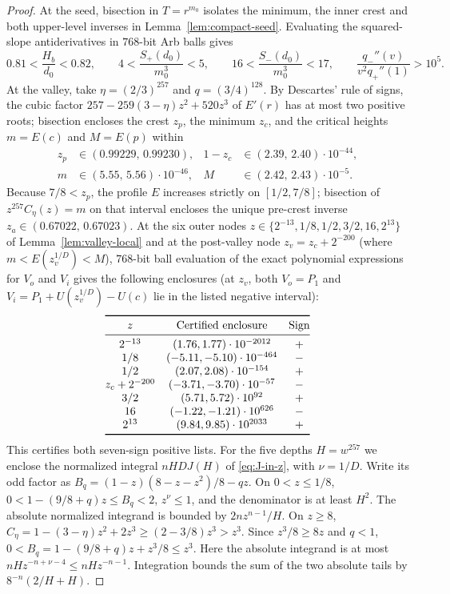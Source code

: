 \begin{proof}
At the seed, bisection in $T=r^{m_0}$ isolates the minimum, the inner
crest and both upper-level inverses in Lemma~\ref{lem:compact-seed}.
Evaluating the squared-slope antiderivatives in $768$-bit Arb balls gives
\[
 0.81<\frac{H_b}{d_0}<0.82,\qquad 4<\frac{S_+(d_0)}{m_0^3}<5,\qquad
 16<\frac{S_-(d_0)}{m_0^3}<17,\qquad \frac{q_-''(v)}{v^2q_+''(1)}>10^5 .
\]
At the valley, take $\eta=(2/3)^{257}$ and $q=(3/4)^{128}$. By Descartes'
rule of signs, the cubic factor $257-259(3-\eta)z^2+520z^3$ of $E'(r)$
has at most two positive roots; bisection encloses the crest $z_p$, the
minimum $z_c$, and the critical heights $m=E(c)$ and $M=E(p)$ within
\[
 \begin{aligned}
  z_p &\in (0.99229,\,0.99230), & 1-z_c &\in (2.39,\,2.40)\cdot 10^{-44}, \\
  m &\in (5.55,\,5.56)\cdot 10^{-46}, & M &\in (2.42,\,2.43)\cdot 10^{-5}.
 \end{aligned}
\]
Because $7/8<z_p$, the profile $E$ increases strictly on $[1/2,7/8]$;
bisection of $z^{257}C_\eta(z)=m$ on that interval encloses the unique
pre-crest inverse $z_a\in(0.67022,\,0.67023)$. At the six outer nodes
$z\in\{2^{-13},1/8,1/2,3/2,16,2^{13}\}$ of Lemma~\ref{lem:valley-local}
and at the post-valley node $z_v=z_c+2^{-200}$ (where $m<E(z_v^{1/D})<M$),
$768$-bit ball evaluation of the exact polynomial expressions for $V_o$
and $V_i$ gives the following enclosures (at $z_v$, both $V_o=P_1$ and
$V_i=P_1+U(z_v^{1/D})-U(c)$ lie in the listed negative interval):
\[
\begin{array}{@{}ccc@{}}
\toprule
 z & \text{Certified enclosure} & \text{Sign}\\
\midrule
 2^{-13} & (1.76,1.77)\cdot 10^{-2012} & +\\
 1/8 & (-5.11,-5.10)\cdot 10^{-464} & -\\
 1/2 & (2.07,2.08)\cdot 10^{-154} & +\\
 z_c+2^{-200} & (-3.71,-3.70)\cdot 10^{-57} & -\\
 3/2 & (5.71,5.72)\cdot 10^{92} & +\\
 16 & (-1.22,-1.21)\cdot 10^{626} & -\\
 2^{13} & (9.84,9.85)\cdot 10^{2033} & +\\
\bottomrule
\end{array}
\]
This certifies both seven-sign positive lists. For the five depths $H=w^{257}$ we enclose the normalized integral
$nHDJ(H)$ of \eqref{eq:J-in-z}, with $\nu=1/D$. Write its odd factor as
$B_q=(1-z)(8-z-z^2)/8-qz$. On $0<z\le1/8$,
$0<1-(9/8+q)z\le B_q<2$, $z^\nu\le1$, and the denominator is at least
$H^2$. The absolute normalized integrand is bounded by $2nz^{n-1}/H$.
On $z\ge8$, $C_\eta=1-(3-\eta)z^2+2z^3\ge(2-3/8)z^3>z^3$.
Since $z^3/8\ge8z$ and $q<1$, $0<B_q=1-(9/8+q)z+z^3/8\le z^3$.
Here the absolute integrand is at most $nHz^{-n+\nu-4}\le nHz^{-n-1}$.
Integration bounds the sum of the two absolute tails by $8^{-n}(2/H+H)$.


\end{proof}
